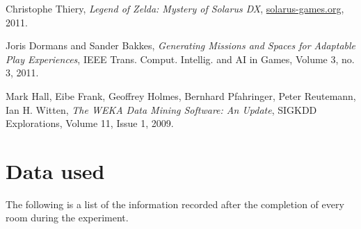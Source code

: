 \documentclass[a4paper]{article}
\begin{document}
\begin{multicols*}{2}
\begin{thebibliography}{9}
Christophe Thiery,
\emph{Legend of Zelda: Mystery of Solarus DX},
\url{solarus-games.org},
2011.

Joris Dormans and Sander Bakkes,
\emph{Generating Missions and Spaces for
Adaptable Play Experiences},
{IEEE} Trans. Comput. Intellig. and {AI} in Games, Volume 3, no. 3,
2011.

Mark Hall, Eibe Frank, Geoffrey Holmes, Bernhard Pfahringer, Peter Reutemann, Ian H. Witten,
\emph{The WEKA Data Mining Software: An Update},
SIGKDD Explorations, Volume 11, Issue 1,
2009.

\end{thebibliography}
\end{multicols*}

\clearpage
\appendix
\section{Data used}
The following is a list of the information recorded after the completion of every room during the experiment.
\end{document}
